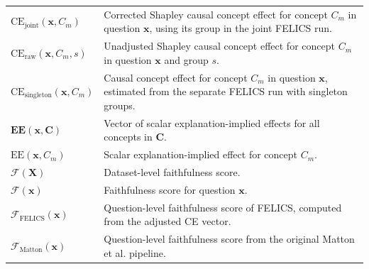 \begin{longtable}{@{}>{\raggedright\arraybackslash}p{} p{}@{}}
	$\mathrm{CE}_{\mathrm{joint}}(\mathbf{x},C_m)$     & Corrected Shapley causal concept effect for concept $C_m$ in question $\mathbf{x}$, using its group in the joint FELICS run.                                                                                       \\
	$\mathrm{CE}_{\mathrm{raw}}(\mathbf{x},C_m,s)$     & Unadjusted Shapley causal concept effect for concept $C_m$ in question $\mathbf{x}$ and group $s$.                                                                                                                 \\
	$\mathrm{CE}_{\mathrm{singleton}}(\mathbf{x},C_m)$ & Causal concept effect for concept $C_m$ in question $\mathbf{x}$, estimated from the separate FELICS run with singleton groups.                                                                                    \\
	$\mathbf{EE}(\mathbf{x},\mathbf{C})$               & Vector of scalar explanation-implied effects for all concepts in $\mathbf{C}$.                                                                                                                                     \\
	$\mathrm{EE}(\mathbf{x},C_m)$                      & Scalar explanation-implied effect for concept $C_m$.                                                                                                                                                               \\
	$\mathcal{F}(\mathbf{X})$                          & Dataset-level faithfulness score.                                                                                                                                                                                  \\
	$\mathcal{F}(\mathbf{x})$                          & Faithfulness score for question $\mathbf{x}$.                                                                                                                                                                      \\
	$\mathcal{F}_{\mathrm{FELICS}}(\mathbf{x})$        & Question-level faithfulness score of FELICS, computed from the adjusted CE vector.                                                                                                                                 \\
	$\mathcal{F}_{\mathrm{Matton}}(\mathbf{x})$        & Question-level faithfulness score from the original Matton et al. \cite{mattonWalkTalkMeasuring2024} pipeline.                                                                                                     \\

\end{longtable}
